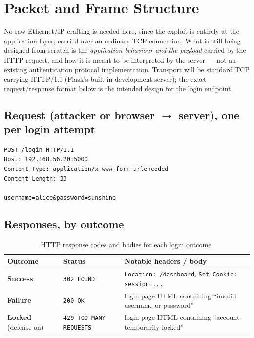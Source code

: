 \documentclass[11pt]{article}
\begin{document}
\section{Packet and Frame Structure}

No raw Ethernet/IP crafting is needed here, since the exploit is entirely at the
application layer, carried over an ordinary TCP connection. What is still being designed from scratch is the \emph{application behaviour and the payload} carried
by the HTTP request, and how it is meant to be
interpreted by the server --- not an existing authentication protocol
implementation. Transport will be standard TCP carrying HTTP/1.1 (Flask's built-in
development server); the exact request/response format below is the intended design
for the login endpoint.

\subsection{Request (attacker or browser $\rightarrow$ server), one per login attempt}

\begin{lstlisting}
POST /login HTTP/1.1
Host: 192.168.56.20:5000
Content-Type: application/x-www-form-urlencoded
Content-Length: 33

username=alice&password=sunshine
\end{lstlisting}

\subsection{Responses, by outcome}

\begin{table}[H]
\centering
\begin{tabularx}{\textwidth}{@{} l l X @{}}
\toprule
\rowcolor{navy!12}
\textbf{Outcome} & \textbf{Status} & \textbf{Notable headers / body} \\
\midrule
\textcolor{oklive}{\textbf{Success}} & \texttt{302 FOUND} & \texttt{Location: /dashboard}, \texttt{Set-Cookie: session=...} \\
\textcolor{warnamber!90!black}{\textbf{Failure}} & \texttt{200 OK} & login page HTML containing ``invalid username or password'' \\
\textcolor{lockred}{\textbf{Locked}} (defense on) & \texttt{429 TOO MANY REQUESTS} & login page HTML containing ``account temporarily locked'' \\
\bottomrule
\end{tabularx}
\caption{HTTP response codes and bodies for each login outcome.}
\end{table}
\end{document}
